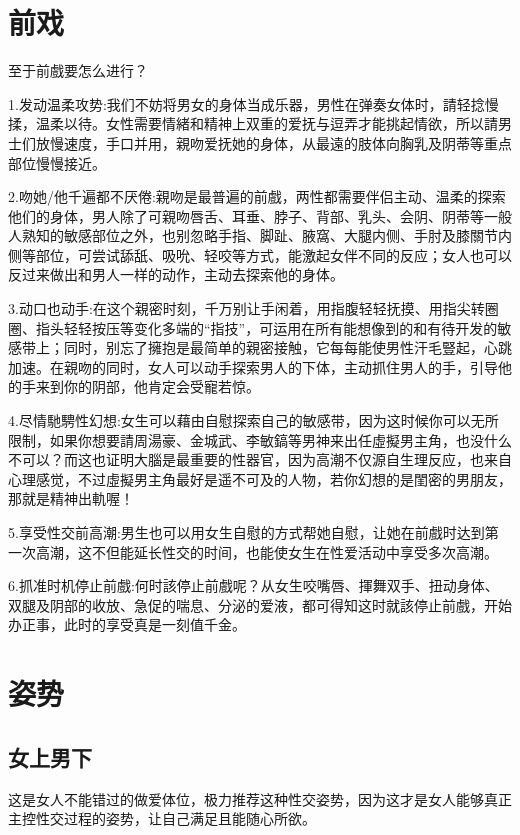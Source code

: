 \documentclass[12pt,UTF8]{ctexbook}
\begin{document}
\chapter{前戏}

至于前戲要怎么进行？

1.发动温柔攻势:我们不妨将男女的身体当成乐器，男性在弹奏女体时，請轻捻慢揉，温柔以待。女性需要情緒和精神上双重的爱抚与逗弄才能挑起情欲，所以請男士们放慢速度，手口并用，親吻爱抚她的身体，从最遠的肢体向胸乳及阴蒂等重点部位慢慢接近。

2.吻她/他千遍都不厌倦:親吻是最普遍的前戲，两性都需要伴侣主动、温柔的探索他们的身体，男人除了可親吻唇舌、耳垂、脖子、背部、乳头、会阴、阴蒂等一般人熟知的敏感部位之外，也别忽略手指、脚趾、腋窩、大腿内侧、手肘及膝關节内侧等部位，可尝试舔舐、吸吮、轻咬等方式，能激起女伴不同的反应；女人也可以反过来做出和男人一样的动作，主动去探索他的身体。

3.动口也动手:在这个親密时刻，千万别让手闲着，用指腹轻轻抚摸、用指尖转圈圈、指头轻轻按压等变化多端的“指技”，可运用在所有能想像到的和有待开发的敏感带上；同时，别忘了擁抱是最简单的親密接触，它每每能使男性汗毛豎起，心跳加速。在親吻的同时，女人可以动手探索男人的下体，主动抓住男人的手，引导他的手来到你的阴部，他肯定会受寵若惊。

4.尽情馳騁性幻想:女生可以藉由自慰探索自己的敏感带，因为这时候你可以无所限制，如果你想要請周湯豪、金城武、李敏鎬等男神来出任虛擬男主角，也没什么不可以？而这也证明大腦是最重要的性器官，因为高潮不仅源自生理反应，也来自心理感觉，不过虛擬男主角最好是遥不可及的人物，若你幻想的是閨密的男朋友，那就是精神出軌喔！

5.享受性交前高潮:男生也可以用女生自慰的方式帮她自慰，让她在前戲时达到第一次高潮，这不但能延长性交的时间，也能使女生在性爱活动中享受多次高潮。

6.抓准时机停止前戲:何时該停止前戲呢？从女生咬嘴唇、揮舞双手、扭动身体、双腿及阴部的收放、急促的喘息、分泌的爱液，都可得知这时就該停止前戲，开始办正事，此时的享受真是一刻值千金。

\chapter{姿势}

\section{女上男下}

这是女人不能错过的做爱体位，极力推荐这种性交姿势，因为这才是女人能够真正主控性交过程的姿势，让自己满足且能随心所欲。
\end{document}
